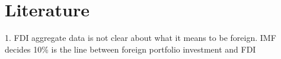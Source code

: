 \section{Literature}


1. FDI aggregate data is not clear about what it means to be foreign. IMF decides 10\% is the line between foreign portfolio investment and FDI